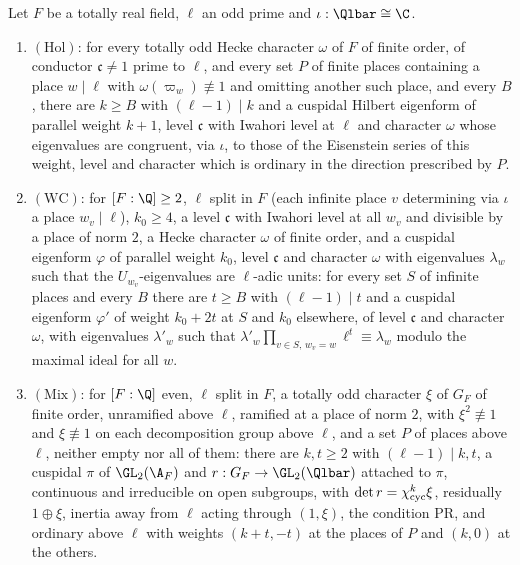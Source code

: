 \begin{definition}\label{pf:eis:hilb}
Let $F$ be a totally real field, $\ell$ an odd prime and $\iota:\Qlbar\cong\C$.
\begin{enumerate}[label=(\alph*)]
\item $(\mathrm{Hol})$: for every totally odd Hecke character $\omega$ of $F$ of finite order, of conductor $\mathfrak c\ne1$ prime to $\ell$, and every
  set $P$ of finite places containing a place $w\mid\ell$ with $\omega(\varpi_w)\not\equiv1$ and omitting another such place, and every $B$, there are
  $k\ge B$ with $(\ell-1)\mid k$ and a cuspidal Hilbert eigenform of parallel weight $k+1$, level $\mathfrak c$ with Iwahori level at $\ell$ and
  character $\omega$ whose eigenvalues are congruent, via $\iota$, to those of the Eisenstein series of this weight, level and character which is
  ordinary in the direction prescribed by $P$.
\item $(\mathrm{WC})$: for $[F:\Q]\ge2$, $\ell$ split in $F$ (each infinite place $v$ determining via $\iota$ a place $w_v\mid\ell$), $k_0\ge4$, a level
  $\mathfrak c$ with Iwahori level at all $w_v$ and divisible by a place of norm $2$, a Hecke character $\omega$ of finite order, and a cuspidal
  eigenform $\varphi$ of parallel weight $k_0$, level $\mathfrak c$ and character $\omega$ with eigenvalues $\lambda_w$ such that the $U_{w_v}$-eigenvalues are
  $\ell$-adic units: for every set $S$ of infinite places and every $B$ there are $t\ge B$ with $(\ell-1)\mid t$ and a cuspidal eigenform $\varphi'$ of
  weight $k_0+2t$ at $S$ and $k_0$ elsewhere, of level $\mathfrak c$ and character $\omega$, with eigenvalues $\lambda'_w$ such that
  $\lambda'_w\prod_{v\in S,\,w_v=w}\ell^t\equiv\lambda_w$ modulo the maximal ideal for all $w$.
\item $(\mathrm{Mix})$: for $[F:\Q]$ even, $\ell$ split in $F$, a totally odd character $\xi$ of $G_F$ of finite order, unramified above $\ell$, ramified at a
  place of norm $2$, with $\xi^2\not\equiv1$ and $\xi\not\equiv1$ on each decomposition group above $\ell$, and a set $P$ of places above $\ell$, neither empty nor
  all of them: there are $k,t\ge2$ with $(\ell-1)\mid k,t$, a cuspidal $\pi$ of $\GL_2(\A_F)$ and $r:G_F\to\GL_2(\Qlbar)$ attached to $\pi$, continuous and
  irreducible on open subgroups, with $\det r=\chi_{\mathrm{cyc}}^k\xi$, residually $1\oplus\xi$, inertia away from $\ell$ acting through $(1,\xi)$, the condition
  $\mathrm{PR}$, and ordinary above $\ell$ with weights $(k+t,-t)$ at the places of $P$ and $(k,0)$ at the others.

\end{enumerate}
\end{definition}
